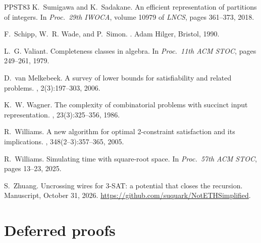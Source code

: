 \documentclass[11pt]{article}
\theoremstyle{definition}
\theoremstyle{definition}
\theoremstyle{remark}
\begin{document}
\begin{thebibliography}{PPST83}
K.~Sumigawa and K.~Sadakane.
\newblock An efficient representation of partitions of integers.
\newblock In {\em Proc.\ 29th IWOCA}, volume 10979 of {\em LNCS}, pages 361--373, 2018.

F.~Schipp, W.~R. Wade, and P.~Simon.
.
\newblock Adam Hilger, Bristol, 1990.

L.~G. Valiant.
\newblock Completeness classes in algebra.
\newblock In {\em Proc.\ 11th ACM STOC}, pages 249--261, 1979.

D.~van Melkebeek.
\newblock A survey of lower bounds for satisfiability and related problems.
, 2(3):197--303, 2006.

K.~W. Wagner.
\newblock The complexity of combinatorial problems with succinct input representation.
, 23(3):325--356, 1986.

R.~Williams.
\newblock A new algorithm for optimal 2-constraint satisfaction and its implications.
, 348(2--3):357--365, 2005.

R.~Williams.
\newblock Simulating time with square-root space.
\newblock In {\em Proc.\ 57th ACM STOC}, pages 13--23, 2025.

S.~Zhuang.
\newblock Uncrossing wires for 3-{SAT}: a potential that closes the recursion.
\newblock Manuscript, October 31, 2026. \url{https://github.com/suquark/NotETHSimplified}.

\end{thebibliography}
\clearpage
\appendix

\section{Deferred proofs}\label{app:proofs}
\end{document}
